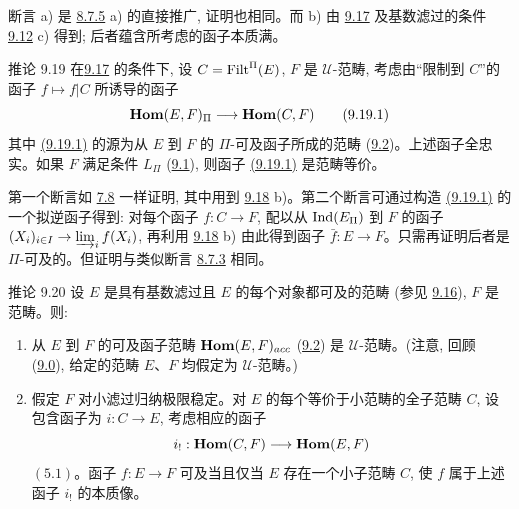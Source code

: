 断言 a) 是 \hyperref[I.prop8.7.5]{8.7.5} a) 的直接推广, 证明也相同。而 b) 由 \hyperref[I.cor9.17]{9.17} 及基数滤过的条件 \hyperref[I.def9.12]{9.12} c) 得到; 后者蕴含所考虑的函子本质满。


\begin{enonce*}{推论 9.19}
在\pageoriginale \hyperref[I.cor9.17]{9.17} 的条件下, 设 $C=\operatorname{Filt}^{\Pi}(E)$, $F$ 是 $𝒰$-范畴, 考虑由“限制到 $C$”的函子 $f\mapsto f| C$ 所诱导的函子
\hypertarget{sga4.exp.I.equation.9.19.1}{}\begin{equation}
\operatorname{\mathbf{Hom}}(E,F)_{\Pi}\longrightarrow \operatorname{\mathbf{Hom}}(C,F)\tag{9.19.1}
\end{equation}
其中 \hyperlink{sga4.exp.I.equation.9.19.1}{(9.19.1)} 的源为从 $E$ 到 $F$ 的 $\Pi$-可及函子所成的范畴 (\hyperref[I.def9.2]{9.2})。上述函子全忠实。如果 $F$ 满足条件 $L_{\Pi}$ (\hyperref[I.def9.1]{9.1}), 则函子 \hyperlink{sga4.exp.I.equation.9.19.1}{(9.19.1)} 是范畴等价。
\end{enonce*}

第一个断言如 \hyperref[I.prop7.8]{7.8} 一样证明, 其中用到 \hyperref[I.cor9.18]{9.18} b)。第二个断言可通过构造 \hyperlink{sga4.exp.I.equation.9.19.1}{(9.19.1)} 的一个拟逆函子得到: 对每个函子 $f:C\rightarrow F$, 配以从 $\operatorname{Ind}(E_{\Pi})$ 到 $F$ 的函子 $(X_i)_{i\in I}\rightarrow
\varinjlim_i f(X_i)$, 再利用 \hyperref[I.cor9.18]{9.18} b) 由此得到函子 $\bar{f}:E\rightarrow
F$。只需再证明后者是 $\Pi$-可及的。但证明与类似断言 \hyperref[I.prop8.7.3]{8.7.3} 相同。

\begin{enonce*}{推论 9.20}
设 $E$ 是具有基数滤过且 $E$ 的每个对象都可及的范畴 (参见 \hyperref[I.prop9.16]{9.16}), $F$ 是范畴。则:
\begin{enumerate}
\renewcommand{\theenumi}{\alph{enumi}}
\renewcommand{\labelenumi}{\theenumi)}
\item 从 $E$ 到 $F$ 的可及函子范畴 $\operatorname{\mathbf{Hom}}(E,F)_{acc}$ (\hyperref[I.def9.2]{9.2}) 是 $𝒰$-范畴。({\rm 注意}, 回顾 (\hyperref[I.sec9.0]{9.0}), 给定的范畴 $E$、$F$ 均假定为 $𝒰$-范畴。)

\item 假定 $F$ 对小滤过归纳极限稳定。对 $E$ 的每个等价于小范畴的全子范畴 $C$, 设包含函子为 $i:C\rightarrow E$, 考虑相应的函子
$$
i_{!}:\operatorname{\mathbf{Hom}}(C,F)\longrightarrow \operatorname{\mathbf{Hom}}(E,F)
$$
$\hyperref[I.prop5.1]{(5.1)}$。\pageoriginale 函子 $f:E\rightarrow F$ 可及当且仅当 $E$ 存在一个小子范畴 $C$, 使 $f$ 属于上述函子 $i_{!}$ 的本质像。
\end{enumerate}
\end{enonce*}

